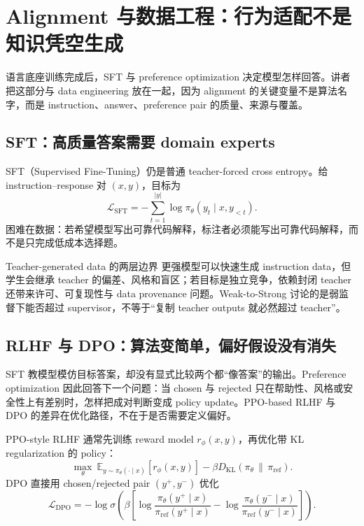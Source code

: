\section{Alignment 与数据工程：行为适配不是知识凭空生成}

语言底座训练完成后，SFT 与 preference optimization 决定模型怎样回答。讲者把这部分与 data engineering 放在一起，因为 alignment 的关键变量不是算法名字，而是 instruction、answer、preference pair 的质量、来源与覆盖。

\subsection{SFT：高质量答案需要 domain experts}

SFT（Supervised Fine-Tuning）仍是普通 teacher-forced cross entropy。给 instruction--response 对 $(x,y)$，目标为
\[
\mathcal{L}_{\text{SFT}}=-\sum_{t=1}^{|y|}\log \pi_\theta(y_t\mid x,y_{<t}).
\]
困难在数据：若希望模型写出可靠代码解释，标注者必须能写出可靠代码解释，而不是只完成低成本选择题。


\begin{knowledgebox}{Teacher-generated data 的两层边界}
更强模型可以快速生成 instruction data，但学生会继承 teacher 的偏差、风格和盲区；若目标是独立竞争，依赖封闭 teacher 还带来许可、可复现性与 data provenance 问题。Weak-to-Strong 讨论的是弱监督下能否超过 supervisor，不等于“复制 teacher outputs 就必然超过 teacher”。
\end{knowledgebox}


\subsection{RLHF 与 DPO：算法变简单，偏好假设没有消失}

SFT 教模型模仿目标答案，却没有显式比较两个都“像答案”的输出。Preference optimization 因此回答下一个问题：当 chosen 与 rejected 只在帮助性、风格或安全性上有差别时，怎样把成对判断变成 policy update。PPO-based RLHF 与 DPO 的差异在优化路径，不在于是否需要定义偏好。

PPO-style RLHF 通常先训练 reward model $r_\phi(x,y)$，再优化带 KL regularization 的 policy：
\[
\max_\theta\ \mathbb{E}_{y\sim\pi_\theta(\cdot\mid x)}[r_\phi(x,y)]
-\beta D_{\mathrm{KL}}\!\left(\pi_\theta\,\|\,\pi_{\text{ref}}\right).
\]
DPO 直接用 chosen/rejected pair $(y^+,y^-)$ 优化
\[
\mathcal{L}_{\text{DPO}}
=-\log\sigma\!\left(\beta\left[
\log\frac{\pi_\theta(y^+\mid x)}{\pi_{\text{ref}}(y^+\mid x)}
-\log\frac{\pi_\theta(y^-\mid x)}{\pi_{\text{ref}}(y^-\mid x)}
\right]\right).
\]

